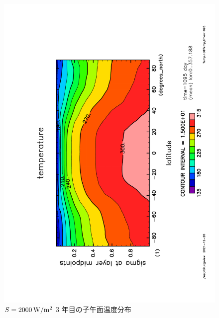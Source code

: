 \documentclass[body]{subfiles}
\begin{document}
\begin{figure}[t]
	\includegraphics[height=\textwidth,angle=-90]{S2000Temp,time=1095.pdf}
	\caption{\(S=2000\hmu{W/m^2}\) 3 年目の子午面温度分布}
\end{figure}
\end{document}
